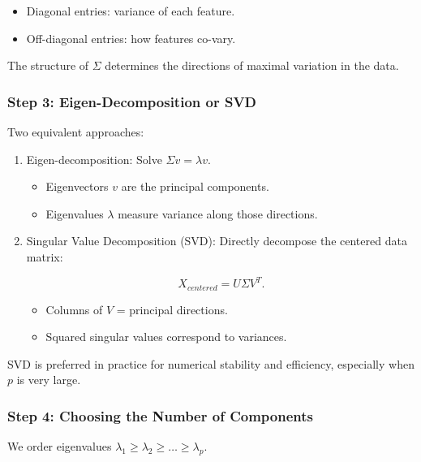 \documentclass[
  letterpaper,
  DIV=11,
  numbers=noendperiod]{scrreprt}
\providecommand{\tightlist}{%
  \setlength{\itemsep}{0pt}\setlength{\parskip}{0pt}}
\begin{document}
\begin{itemize}
\tightlist
\item
  Diagonal entries: variance of each feature.
\item
  Off-diagonal entries: how features co-vary.
\end{itemize}

The structure of \(\Sigma\) determines the directions of maximal
variation in the data.

\subsubsection{Step 3: Eigen-Decomposition or
SVD}\label{step-3-eigen-decomposition-or-svd}

Two equivalent approaches:

\begin{enumerate}
\def\labelenumi{\arabic{enumi}.}
\item
  Eigen-decomposition: Solve \(\Sigma v = \lambda v\).

  \begin{itemize}
  \tightlist
  \item
    Eigenvectors \(v\) are the principal components.
  \item
    Eigenvalues \(\lambda\) measure variance along those directions.
  \end{itemize}
\item
  Singular Value Decomposition (SVD): Directly decompose the centered
  data matrix:

  \[
  X_{centered} = U \Sigma V^T.
  \]

  \begin{itemize}
  \tightlist
  \item
    Columns of \(V\) = principal directions.
  \item
    Squared singular values correspond to variances.
  \end{itemize}
\end{enumerate}

SVD is preferred in practice for numerical stability and efficiency,
especially when \(p\) is very large.

\subsubsection{Step 4: Choosing the Number of
Components}\label{step-4-choosing-the-number-of-components}

We order eigenvalues
\(\lambda_1 \geq \lambda_2 \geq \dots \geq \lambda_p\).
\end{document}
